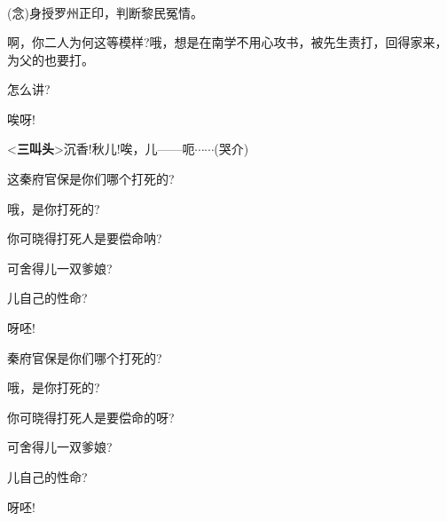 \newpage\hspace{30pt}~

{%

\subsubsection{\large{}}

{\vspace{5pt}}

{({\akai 念})身授罗州正印，判断黎民冤情。}

{啊，你二人为何这等模样?哦，}想是在南学不用心攻书，被先生责打，回得家来，为父的也要打。

怎么讲?\hspace{20pt}~

唉呀!\hspace{30pt}~


{\textless{}{\!\bfseries\akai 三叫头}\!\textgreater{}沉香!秋儿!唉，儿------呃$\cdots{}\cdots{}$({\hwfs 哭}{\hwfs 介})}


{这秦府官保是你们哪个打死的?}

{哦，是你打死的?}

{你可晓得打死人是要偿命呐?}

{可舍得儿一双爹娘?}

{儿自己的性命?}

{呀呸!}\hspace{20pt}~



{秦府官保是你们哪个打死的?}

{哦，是你打死的?}

{你可晓得打死人是要偿命的呀?}

{可舍得儿一双爹娘?}

{儿自己的性命?}

{呀呸!}\hspace{20pt}~

}
